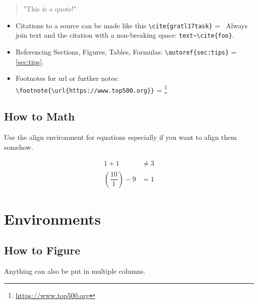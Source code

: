 \documentclass[
			   fontsize=11pt,
               paper=a4,
               bibliography=totoc,
               idxtotoc,
               headsepline,
               footsepline,
               footinclude=false,
               BCOR=12mm,
               DIV=13,
               openany,   %
               ]
               {scrbook}
\begin{document}
\begin{quote}
	"This is a quote!"
\end{quote}

\begin{itemize}
	\item Citations to a source can be made like this \verb|\cite{gratl17task}| =~\cite{gratl17task}
	\subitem Always join text and the citation with a non-breaking space: \verb|text~\cite{foo}|.
	\item Referencing Sections, Figures, Tables, Formulas: \verb|\autoref{sec:tips}| = \autoref{sec:tips}.
	\item Footnotes for url or further notes: \verb|\footnote{\url{https://www.top500.org}}| = \footnote{\url{https://www.top500.org}}
\end{itemize}

\subsection{How to Math}

Use the align environment for equations especially if you want to align them somehow.

\begin{align}
	1 + 1 &\ne 3\\
	\left(\dfrac{10}{1}\right) - 9 &= 1
\end{align}

\clearpage

\section{Environments}

\subsection{How to Figure}

Anything can also be put in multiple columns.
\end{document}
